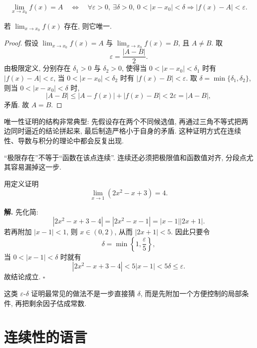 \documentclass[a4paper,12pt,oneside]{maki-notes}
\begin{document}
\begin{keyformula}
\[
\lim_{x \to x_0} f(x) = A
\quad\Longleftrightarrow\quad
\forall \varepsilon > 0,\ \exists \delta > 0,\ 0<|x-x_0|<\delta \Rightarrow |f(x)-A|<\varepsilon.
\]
\end{keyformula}

\begin{theorem}[极限的唯一性]
若 $\lim_{x \to x_0} f(x)$ 存在, 则它唯一.
\end{theorem}

\begin{proof}
假设 $\lim_{x \to x_0} f(x) = A$ 与 $\lim_{x \to x_0} f(x) = B$, 且 $A \neq B$. 取
\[
\varepsilon = \dfrac{|A-B|}{2}.
\]
由极限定义, 分别存在 $\delta_1 > 0$ 与 $\delta_2 > 0$, 使得当 $0 < |x-x_0| < \delta_1$ 时有 $|f(x)-A| < \varepsilon$, 当 $0 < |x-x_0| < \delta_2$ 时有 $|f(x)-B| < \varepsilon$. 取 $\delta = \min\{\delta_1,\delta_2\}$, 则当 $0<|x-x_0|<\delta$ 时,
\[
|A-B| \le |A-f(x)| + |f(x)-B| < 2\varepsilon = |A-B|,
\]
矛盾. 故 $A=B$.
\end{proof}

\begin{note}
唯一性证明的结构非常典型: 先假设存在两个不同候选值, 再通过三角不等式把两边同时逼近的结论拼起来, 最后制造严格小于自身的矛盾. 这种证明方式在连续性、导数与积分的理论中都会反复出现.
\end{note}

\begin{pitfall}
“极限存在”不等于“函数在该点连续”. 连续还必须把极限值和函数值对齐, 分段点尤其容易漏掉这一步.
\end{pitfall}

\begin{example}
用定义证明
\[
\lim_{x \to 1} (2x^2 - x + 3) = 4.
\]
\end{example}

\textbf{解.} 先化简:
\[
|2x^2 - x + 3 - 4| = |2x^2 - x - 1| = |x-1||2x+1|.
\]
若再附加 $|x-1| < 1$, 则 $x \in (0,2)$, 从而 $|2x+1| < 5$. 因此只要令
\[
\delta = \min\left\{1,\dfrac{\varepsilon}{5}\right\},
\]
当 $0<|x-1|<\delta$ 时就有
\[
|2x^2 - x + 3 - 4| < 5|x-1| < 5\delta \le \varepsilon.
\]
故结论成立. \hfill $\square$

\begin{methodnote}
这类 $\varepsilon$-$\delta$ 证明最常见的做法不是一步直接猜 $\delta$, 而是先附加一个方便控制的局部条件, 再把剩余因子估成常数.
\end{methodnote}

\section{连续性的语言}
\end{document}
